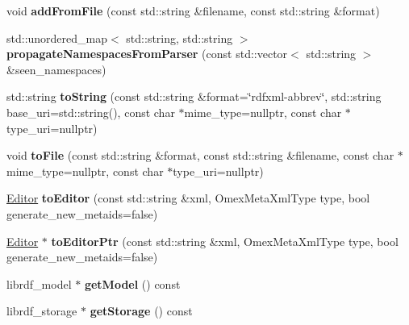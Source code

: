 \begin{DoxyCompactItemize}
void {\bfseries add\+From\+File} (const std\+::string \&filename, const std\+::string \&format)
\item 
\mbox{\label{classomexmeta_1_1RDF_af5f598560ab2a4ebe661f9bdb8665755}} 
std\+::unordered\+\_\+map$<$ std\+::string, std\+::string $>$ {\bfseries propagate\+Namespaces\+From\+Parser} (const std\+::vector$<$ std\+::string $>$ \&seen\+\_\+namespaces)
\item 
\mbox{\label{classomexmeta_1_1RDF_aca5e83398eb1739c02c7ab4852e09784}} 
std\+::string {\bfseries to\+String} (const std\+::string \&format=\char`\"{}rdfxml-\/abbrev\char`\"{}, std\+::string base\+\_\+uri=std\+::string(), const char $\ast$mime\+\_\+type=nullptr, const char $\ast$type\+\_\+uri=nullptr)
\item 
\mbox{\label{classomexmeta_1_1RDF_aa2348d3e28641a2b1079fddcacfd50dd}} 
void {\bfseries to\+File} (const std\+::string \&format, const std\+::string \&filename, const char $\ast$mime\+\_\+type=nullptr, const char $\ast$type\+\_\+uri=nullptr)
\item 
\mbox{\label{classomexmeta_1_1RDF_a1766b940e69990ce28b60309615c12ce}} 
\hyperlink{classomexmeta_1_1Editor}{Editor} {\bfseries to\+Editor} (const std\+::string \&xml, Omex\+Meta\+Xml\+Type type, bool generate\+\_\+new\+\_\+metaids=false)
\item 
\mbox{\label{classomexmeta_1_1RDF_aabdb57f01b0e83a4ac93e9548387cda9}} 
\hyperlink{classomexmeta_1_1Editor}{Editor} $\ast$ {\bfseries to\+Editor\+Ptr} (const std\+::string \&xml, Omex\+Meta\+Xml\+Type type, bool generate\+\_\+new\+\_\+metaids=false)
\item 
\mbox{\label{classomexmeta_1_1RDF_a8007b0ce5729c7dd3f8cab86d42216f5}} 
librdf\+\_\+model $\ast$ {\bfseries get\+Model} () const
\item 
\mbox{\label{classomexmeta_1_1RDF_a71b0e5f3b85a87c2231e7700d86060c3}} 
librdf\+\_\+storage $\ast$ {\bfseries get\+Storage} () const
\item 
\mbox{\label{classomexmeta_1_1RDF_a711f228bb86c5cbf9740f64b8633d04c}} 

\end{DoxyCompactItemize}

